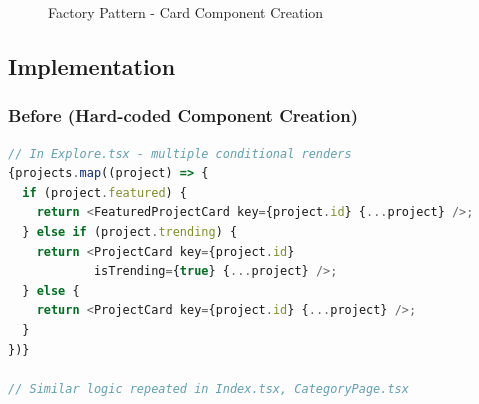 \documentclass[12pt,a4paper]{article}
\begin{document}
\begin{figure}[H]
\centering
{}
\caption{Factory Pattern - Card Component Creation}
\end{figure}

\subsection{Implementation}

\subsubsection{Before (Hard-coded Component Creation)}
\begin{lstlisting}[language=JavaScript, caption=Original component usage]
// In Explore.tsx - multiple conditional renders
{projects.map((project) => {
  if (project.featured) {
    return <FeaturedProjectCard key={project.id} {...project} />;
  } else if (project.trending) {
    return <ProjectCard key={project.id} 
            isTrending={true} {...project} />;
  } else {
    return <ProjectCard key={project.id} {...project} />;
  }
})}

// Similar logic repeated in Index.tsx, CategoryPage.tsx
\end{lstlisting}
\end{document}
